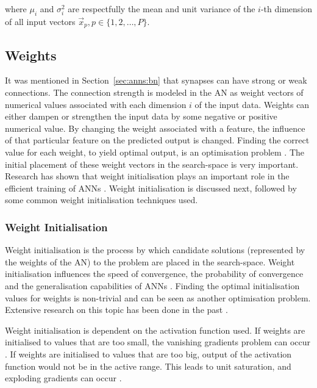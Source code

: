 \noindent where $\mu_i$ and $\sigma^2_i$ are respectfully the mean and unit
variance of the $i$-th dimension of all input vectors $\vec{x}_p, p \in \{1,2,
\dots, P\}$.

\subsection{Weights}
\label{sec:anns:an:weights}

It was mentioned in Section~\ref{sec:anns:bn} that synapses can
have strong or weak connections. The connection strength is modeled in the
\ac{AN} as weight vectors of numerical values associated with each dimension $i$
of the input data. Weights can either dampen or strengthen the input data by
some negative or positive numerical value. By changing the weight associated
with a feature, the influence of that particular feature on the predicted output
is changed. Finding the correct value for each weight, to yield optimal output,
is an optimisation problem \cite{ref:thierens:1993}. The initial placement of
these weight vectors in the search-space is very important. Research has shown
that weight initialisation plays an important role in the efficient training of
\acp{ANN} \cite{ref:thimm:1995}. Weight initialisation is discussed next,
followed by some common weight initialisation techniques used.

\subsubsection{Weight Initialisation}
\label{sec:anns:an:weights:initialisation}

Weight initialisation is the process by which candidate solutions (represented
by the weights of the \ac{AN}) to the problem are placed in the search-space.
Weight initialisation influences the speed of convergence, the probability of
convergence and the generalisation capabilities of \acp{ANN}
\cite{ref:fernandez:2001}. Finding the optimal initialisation values for weights
is non-trivial and can be seen as another optimisation problem. Extensive
research on this topic has been done in the past \cite{ref:de:2016,
ref:erdogmus:2003, ref:yam:2000}.

Weight initialisation is dependent on the
activation function used. If weights are initialised
to values that are too small, the vanishing gradients problem can occur
\cite{ref:hanin:2018}. If weights are initialised to values that are too big,
output of the activation function would not be in the active range. This leads
to unit saturation, and exploding gradients can occur
\cite{ref:hanin:2018, ref:yadav:2018}.

